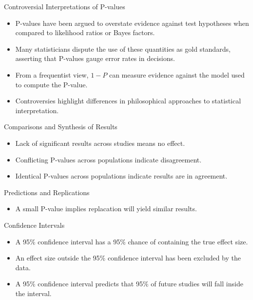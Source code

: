 \documentclass[aspectratio=169, 12pt]{beamer}
\begin{document}
\begin{frame}{Controversial Interpretations of P-values}
\begin{itemize}
    \item P-values have been argued to overstate evidence against test hypotheses when compared to likelihood ratios or Bayes factors.
    \item Many statisticians dispute the use of these quantities as gold standards, asserting that P-values gauge error rates in decisions.
    \item From a frequentist view, \( 1 - P \) can measure evidence against the model used to compute the P-value.
    \item Controversies highlight differences in philosophical approaches to statistical interpretation.
\end{itemize}
\end{frame}

\begin{frame}{Comparisons and Synthesis of Results} %
\begin{itemize}
    \item Lack of significant results across studies means no effect.
    \item Conflicting P-values across populations indicate disagreement.
    \item Identical P-values across populations indicate results are in agreement.
\end{itemize}
\end{frame}

\begin{frame}{Predictions and Replications} %
\begin{itemize}
    \item A small P-value implies replacation will yield similar results.
\end{itemize}
\end{frame}

\begin{frame}{Confidence Intervals} %
\begin{itemize}
    \item A 95\% confidence interval has a 95\% chance of containing the true effect size.
    \item An effect size outside the 95\% confidence interval has been excluded by the data.
    \item A 95\% confidence interval predicts that 95\% of future studies will fall inside the interval.
\end{itemize}
\end{frame}
\end{document}
